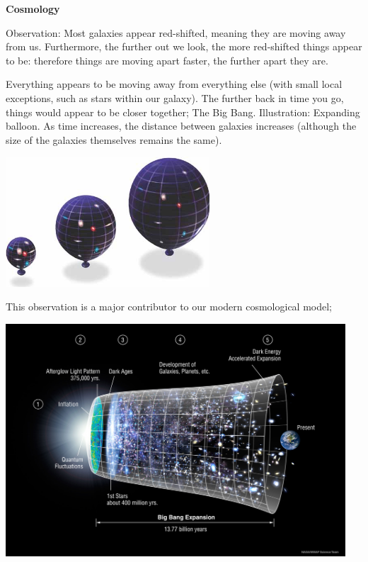 \documentclass[12pt]{article}
\begin{document}
\vspace{0.3in}
\noindent\textbf{\large Cosmology}

Observation: Most galaxies appear red-shifted, meaning they are moving away from us. Furthermore, the further out we look, the more red-shifted things appear to be: therefore things are moving apart faster, the further apart they are.

Everything appears to be moving away from everything else (with small local exceptions, such as stars within our galaxy). The further back in time you go, things would appear to be closer together; The Big Bang. Illustration: Expanding balloon. As time increases, the distance between galaxies increases (although the size of the galaxies themselves remains the same).
\begin{center}
\includegraphics[width=3in]{../images/balloonUniverse.jpg}
\end{center}


This observation is a major contributor to our modern cosmological model;

\noindent\begin{center}
\includegraphics[width=5in]{../images/universeTimeLine.jpg}
\end{center}
\end{document}
